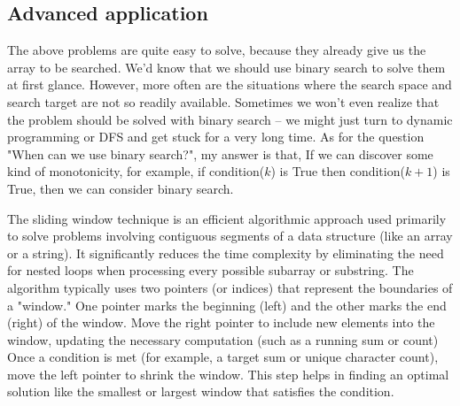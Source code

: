 \documentclass{report}
\begin{document}
   \bigbreak \noindent 
   \subsection{Advanced application}
   \bigbreak \noindent 
   The above problems are quite easy to solve, because they already give us the array to be searched. We'd know that we should use binary search to solve them at first glance. However, more often are the situations where the search space and search target are not so readily available. Sometimes we won't even realize that the problem should be solved with binary search -- we might just turn to dynamic programming or DFS and get stuck for a very long time.
   \bigbreak \noindent 
   As for the question "When can we use binary search?", my answer is that, If we can discover some kind of monotonicity, for example, if condition($k$) is True then condition($k + 1$) is True, then we can consider binary search.


   








   \pagebreak 
   \bigbreak \noindent 
   The sliding window technique is an efficient algorithmic approach used primarily to solve problems involving contiguous segments of a data structure (like an array or a string). It significantly reduces the time complexity by eliminating the need for nested loops when processing every possible subarray or substring.
   \bigbreak \noindent 
   The algorithm typically uses two pointers (or indices) that represent the boundaries of a "window." One pointer marks the beginning (left) and the other marks the end (right) of the window.
   \bigbreak \noindent 
   Move the right pointer to include new elements into the window, updating the necessary computation (such as a running sum or count)
   \bigbreak \noindent 
   Once a condition is met (for example, a target sum or unique character count), move the left pointer to shrink the window. This step helps in finding an optimal solution like the smallest or largest window that satisfies the condition.
   \bigbreak \noindent 
\end{document}

